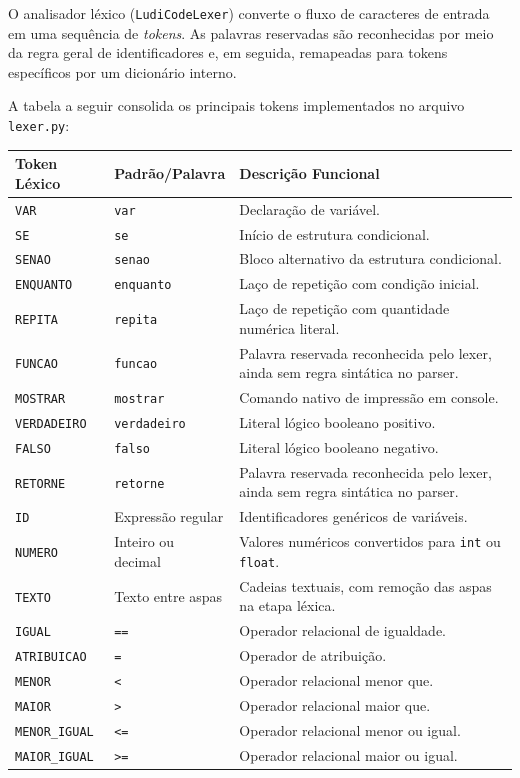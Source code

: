 \documentclass[12pt,a4paper]{article}
\begin{document}
O analisador léxico (\texttt{LudiCodeLexer}) converte o fluxo de caracteres de entrada em uma sequência de \textit{tokens}. As palavras reservadas são reconhecidas por meio da regra geral de identificadores e, em seguida, remapeadas para tokens específicos por um dicionário interno.

A tabela a seguir consolida os principais tokens implementados no arquivo \texttt{lexer.py}:

\begin{center}
\begin{tabular}{llp{7cm}}
\hline
\textbf{Token Léxico} & \textbf{Padrão/Palavra} & \textbf{Descrição Funcional} \\
\hline
\texttt{VAR}        & \texttt{var}       & Declaração de variável. \\
\texttt{SE}         & \texttt{se}        & Início de estrutura condicional. \\
\texttt{SENAO}      & \texttt{senao}     & Bloco alternativo da estrutura condicional. \\
\texttt{ENQUANTO}   & \texttt{enquanto}  & Laço de repetição com condição inicial. \\
\texttt{REPITA}     & \texttt{repita}    & Laço de repetição com quantidade numérica literal. \\
\texttt{FUNCAO}     & \texttt{funcao}    & Palavra reservada reconhecida pelo lexer, ainda sem regra sintática no parser. \\
\texttt{MOSTRAR}    & \texttt{mostrar}   & Comando nativo de impressão em console. \\
\texttt{VERDADEIRO} & \texttt{verdadeiro}& Literal lógico booleano positivo. \\
\texttt{FALSO}      & \texttt{falso}     & Literal lógico booleano negativo. \\
\texttt{RETORNE}    & \texttt{retorne}   & Palavra reservada reconhecida pelo lexer, ainda sem regra sintática no parser. \\
\texttt{ID}         & Expressão regular  & Identificadores genéricos de variáveis. \\
\texttt{NUMERO}     & Inteiro ou decimal & Valores numéricos convertidos para \texttt{int} ou \texttt{float}. \\
\texttt{TEXTO}      & Texto entre aspas  & Cadeias textuais, com remoção das aspas na etapa léxica. \\
\texttt{IGUAL}      & \texttt{==}        & Operador relacional de igualdade. \\
\texttt{ATRIBUICAO} & \texttt{=}         & Operador de atribuição. \\
\texttt{MENOR}      & \texttt{<}         & Operador relacional menor que. \\
\texttt{MAIOR}      & \texttt{>}         & Operador relacional maior que. \\
\texttt{MENOR\_IGUAL} & \texttt{<=}      & Operador relacional menor ou igual. \\
\texttt{MAIOR\_IGUAL} & \texttt{>=}      & Operador relacional maior ou igual. \\
\hline
\end{tabular}
\end{center}
\end{document}
